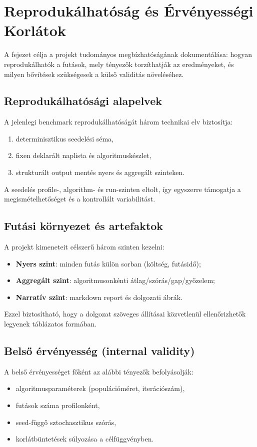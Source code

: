 \chapter{Reprodukálhatóság és Érvényességi Korlátok}\label{ch:REPRO}

\begin{osszefoglal}
A fejezet célja a projekt tudományos megbízhatóságának dokumentálása: hogyan reprodukálhatók a futások, mely tényezők torzíthatják az eredményeket, és milyen bővítések szükségesek a külső validitás növeléséhez.
\end{osszefoglal}

\section{Reprodukálhatósági alapelvek}
A jelenlegi benchmark reprodukálhatóságát három technikai elv biztosítja:
\begin{enumerate}
  \item determinisztikus seedelési séma,
  \item fixen deklarált naplista és algoritmuskészlet,
  \item strukturált output mentés nyers és aggregált szinteken.
\end{enumerate}

A seedelés profile-, algorithm- és run-szinten eltolt, így egyszerre támogatja a megismételhetőséget és a kontrollált variabilitást.

\section{Futási környezet és artefaktok}
A projekt kimeneteit célszerű három szinten kezelni:
\begin{itemize}
  \item \textbf{Nyers szint}: minden futás külön sorban (költség, futásidő);
  \item \textbf{Aggregált szint}: algoritmusonkénti átlag/szórás/gap/győzelem;
  \item \textbf{Narratív szint}: markdown report és dolgozati ábrák.
\end{itemize}

Ezzel biztosítható, hogy a dolgozat szöveges állításai közvetlenül ellenőrizhetők legyenek táblázatos formában.

\section{Belső érvényesség (internal validity)}
A belső érvényességet főként az alábbi tényezők befolyásolják:
\begin{itemize}
  \item algoritmusparaméterek (populációméret, iterációszám),
  \item futások száma profilonként,
  \item seed-függő sztochasztikus szórás,
  \item korlátbüntetések súlyozása a célfüggvényben.
\end{itemize}

